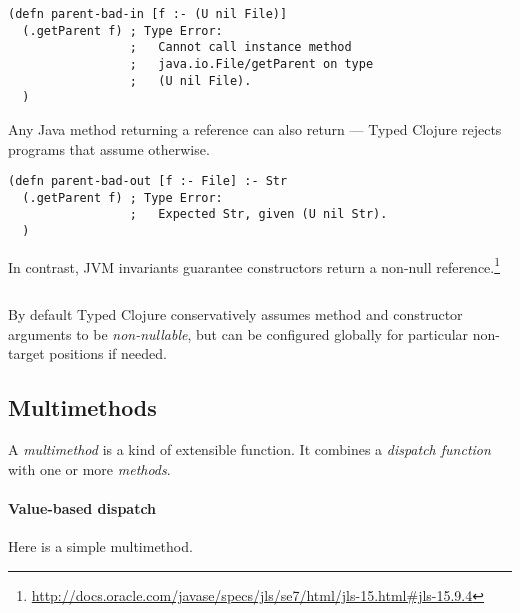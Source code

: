 \begin{verbatim}
(defn parent-bad-in [f :- (U nil File)]
  (.getParent f) ; Type Error:
                 ;   Cannot call instance method 
                 ;   java.io.File/getParent on type 
                 ;   (U nil File).
  )
\end{verbatim}

Any Java method returning a reference can also return  ---
Typed Clojure rejects programs that assume otherwise.

\begin{verbatim}
(defn parent-bad-out [f :- File] :- Str
  (.getParent f) ; Type Error:
                 ;   Expected Str, given (U nil Str).
  )
\end{verbatim}

%

In contrast, JVM invariants guarantee constructors return a non-null reference.\footnote{\url{http://docs.oracle.com/javase/specs/jls/se7/html/jls-15.html#jls-15.9.4}}

\begin{exmp}
\inputminted[firstline=15,lastline=16]{clojure}{code/demo/src/demo/parent3.clj}
\end{exmp}

By default Typed Clojure conservatively assumes method and constructor arguments to be \emph{non-nullable},
but can be configured globally for particular non-target positions if needed.

\subsection{Multimethods}

\label{sec:multioverview}

A \emph{multimethod} is a kind of extensible function. It combines
a \emph{dispatch function} with one or more \emph{methods}.

\paragraph{Value-based dispatch}
Here is a simple multimethod.

